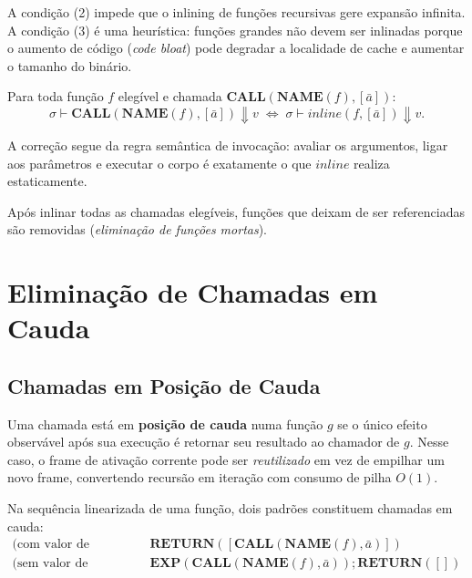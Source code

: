 A condição (2) impede que o inlining de funções recursivas gere
expansão infinita.
A condição (3) é uma heurística: funções grandes não devem ser inlinadas porque
o aumento de código (\emph{code bloat}) pode degradar a localidade de cache e
aumentar o tamanho do binário.

\begin{Theorem}\label{thm:inline-correct}
  Para toda função $f$ elegível e chamada
  $\mathbf{CALL}(\mathbf{NAME}(f), [\bar{a}])$:
  \[
    \sigma \vdash \mathbf{CALL}(\mathbf{NAME}(f), [\bar{a}]) \Downarrow v
    \;\iff\;
    \sigma \vdash \mathit{inline}(f, [\bar{a}]) \Downarrow v.
  \]
\end{Theorem}

A correção segue da regra semântica de invocação: avaliar os argumentos, ligar
aos parâmetros e executar o corpo é exatamente o que $\mathit{inline}$ realiza
estaticamente.

Após inlinar todas as chamadas elegíveis, funções que deixam de ser
referenciadas
são removidas (\emph{eliminação de funções mortas}).

\section{Eliminação de Chamadas em Cauda}\label{sec:opt-tco}

\subsection{Chamadas em Posição de Cauda}

Uma chamada está em \textbf{posição de cauda} numa função $g$ se o único efeito
observável após sua execução é retornar seu resultado ao chamador de $g$.  Nesse
caso, o frame de ativação corrente pode ser \emph{reutilizado} em vez
de empilhar
um novo frame, convertendo recursão em iteração com consumo de pilha $O(1)$.

\begin{Definition}\label{def:tail-call}
  Na sequência linearizada de uma função, dois padrões constituem chamadas em
  cauda:
  \begin{align*}
    \text{(com valor de retorno)} &\quad
    \mathbf{RETURN}([\mathbf{CALL}(\mathbf{NAME}(f), \bar{a})]) \\
    \text{(sem valor de retorno)} &\quad
    \mathbf{EXP}(\mathbf{CALL}(\mathbf{NAME}(f), \bar{a})) \mathbin{;}
    \mathbf{RETURN}([])
  \end{align*}
\end{Definition}

